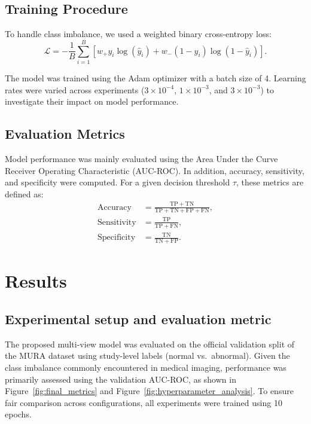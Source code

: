 \documentclass[conference]{IEEEtran}
\begin{document}
\subsection{Training Procedure}

To handle class imbalance, we used a weighted binary cross-entropy loss:
\begin{equation}
\mathcal{L} =
- \frac{1}{B} \sum_{i=1}^{B}
\left[
w_{+} y_i \log(\hat{y}_i)
+
w_{-} (1 - y_i) \log(1 - \hat{y}_i)
\right].
\end{equation}

The model was trained using the Adam optimizer\cite{kingma_adam_2017} with a batch size of 4. Learning rates were varied across experiments ($3 \times 10^{-4}$, $1 \times 10^{-3}$, and $3 \times 10^{-3}$) to investigate their impact on model performance.

\subsection{Evaluation Metrics}

Model performance was mainly evaluated using the Area Under the Curve Receiver Operating Characteristic (AUC-ROC). In addition, accuracy, sensitivity, and specificity were computed. For a given decision threshold $\tau$, these metrics are defined as:
\begin{align}
\text{Accuracy} &= \frac{\mathrm{TP} + \mathrm{TN}}{\mathrm{TP} + \mathrm{TN} + \mathrm{FP} + \mathrm{FN}}, \\
\text{Sensitivity} &= \frac{\mathrm{TP}}{\mathrm{TP} + \mathrm{FN}}, \\
\text{Specificity} &= \frac{\mathrm{TN}}{\mathrm{TN} + \mathrm{FP}}.
\end{align}


\section{Results}

\subsection{Experimental setup and evaluation metric}
The proposed multi-view model was evaluated on the official validation split of the MURA dataset using study-level labels (normal vs.\ abnormal). Given the class imbalance commonly encountered in medical imaging, performance was primarily assessed using the validation AUC-ROC, as shown in Figure~\ref{fig:final_metrics} and Figure~\ref{fig:hyperparameter_analysis}. To ensure fair comparison across configurations, all experiments were trained using 10 epochs.
\end{document}
